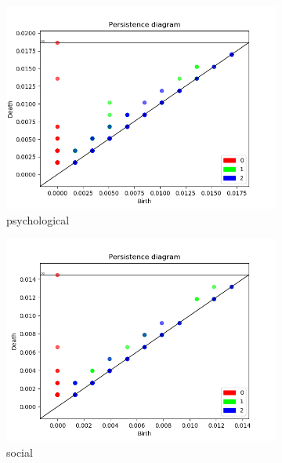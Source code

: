 \documentclass[fleqn]{article}
\begin{document}
\begin{figure}
\begin{subfigure}[t]{0.425\textwidth}
    	\includegraphics[width=\textwidth]{figures/stopwords_excluded/psychological.png}
    	\caption{psychological}
        \label{fig:sw:psychological}
    \end{subfigure}\hfill
	\begin{subfigure}[t]{0.425\textwidth}
    	\includegraphics[width=\textwidth]{figures/stopwords_excluded/social.png}
    	\caption{social}
        \label{fig:sw:social}
    \end{subfigure}\hfill
    \\
	\begin{subfigure}[t]{0.425\textwidth}

\end{subfigure}
\end{figure}
\end{document}

